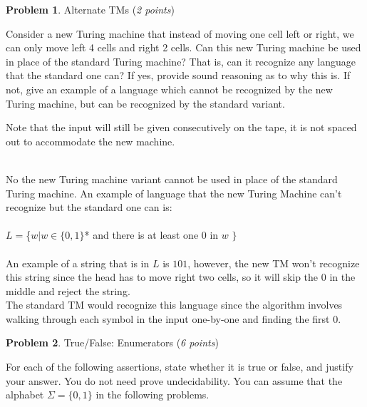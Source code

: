 \documentclass[11pt]{article}
\theoremstyle{definition}
\theoremstyle{theorem}
\newtheorem{prob}{Problem}
\newcommand{\solution}{\medskip\noindent{\color{blue}\textbf{Solution:}}}
\begin{document}
\newpage

\begin{prob} Alternate TMs (\emph{2 points})\end{prob}

Consider a new Turing machine that instead of moving one cell left or right, we can only move left 4 cells and right 2 cells. Can this new Turing machine be used in place of the standard Turing machine? That is, can it recognize any language that the standard one can? If yes, provide sound reasoning as to why this is. If not, give an example of a language which cannot be recognized by the new Turing machine, but can be recognized by the standard variant.

Note that the input will still be given consecutively on the tape, it is not spaced out to accommodate the new machine.

\solution \\
No the new Turing machine variant cannot be used in place of the standard Turing machine. An example of language that the new Turing Machine can't recognize but the standard one can is: \\ ~ \\

\noindent $L = $\{$ w | w \in \{0, 1\}$* and there is at least one 0 in $w$ $\}$ \\~\\

\noindent An example of a string that is in $L$ is $101$, however, the new TM won't recognize this string since the head has to move right two cells, so it will skip the 0 in the middle and reject the string. \\ 

\noindent The standard TM would recognize this language since the algorithm involves walking through each symbol in the input one-by-one and finding the first 0. 

\newpage

\begin{prob} True/False: Enumerators (\emph{6 points})\end{prob}


For each of the following assertions, state whether it is true or false, and justify your answer. You do not need prove undecidability. You can assume that the alphabet $\Sigma = \{0, 1\}$ in the following problems.
\end{document}
